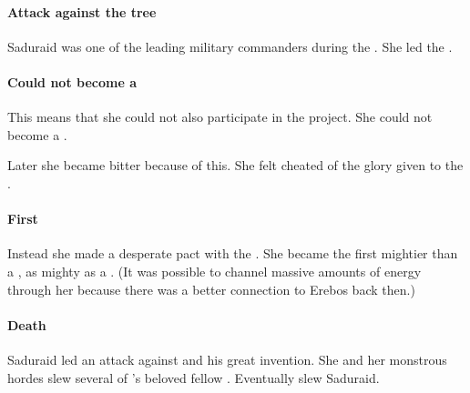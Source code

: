 \subsubsection{Attack against the tree}
Saduraid was one of the leading military commanders during the . 
She led the . 





\subsubsection{Could not become a \sathariah}
This means that she could not also participate in the \sathariah project. 
She could not become a \sathariah.

Later she became bitter because of this.
She felt cheated of the glory given to the \satharioth. 





\subsubsection{First \neoresphan}
Instead she made a desperate pact with the \banes.
She became the first \dash mightier than a \sathariah, as mighty as a \dragon.
(It was possible to channel massive amounts of \bane energy through her because there was a better connection to Erebos back then.) 





\subsubsection{Death}
Saduraid led an attack against \Secherdamon and {his great invention}. 
She and her monstrous hordes slew several of \Secherdamon's beloved fellow \dragons.
Eventually \Secherdamon slew Saduraid. 






















\chapter{\TiphredSerah}















